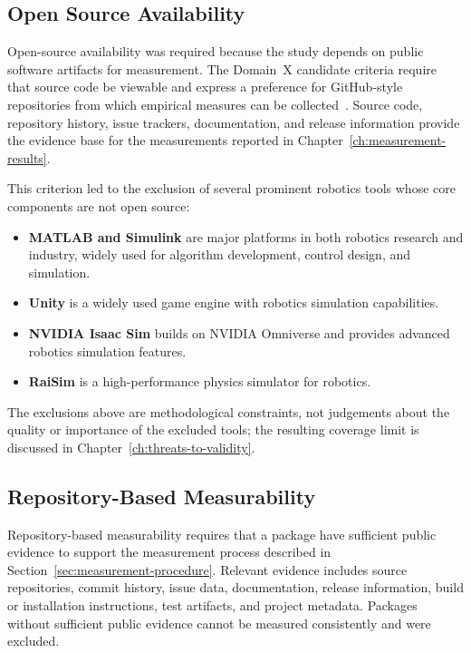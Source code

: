 \subsection{Open Source Availability}
\label{subsec:open-source-availability}

Open-source availability was required because the study depends on public software artifacts for measurement. The Domain~X candidate criteria require that source code be viewable and express a preference for GitHub-style repositories from which empirical measures can be collected~\citep{Smith2021}. Source code, repository history, issue trackers, documentation, and release information provide the evidence base for the measurements reported in Chapter~\ref{ch:measurement-results}.

This criterion led to the exclusion of several prominent robotics tools whose core components are not open source:

\begin{itemize}
    \item \textbf{MATLAB and Simulink} are major platforms in both robotics research and industry, widely used for algorithm development, control design, and simulation.
    \item \textbf{Unity} is a widely used game engine with robotics simulation capabilities.
    \item \textbf{NVIDIA Isaac Sim} builds on NVIDIA Omniverse and provides advanced robotics simulation features.
    \item \textbf{RaiSim} is a high-performance physics simulator for robotics.
\end{itemize}

The exclusions above are methodological constraints, not judgements about the quality or importance of the excluded tools; the resulting coverage limit is discussed in Chapter~\ref{ch:threats-to-validity}.

\subsection{Repository-Based Measurability}
\label{subsec:repository-based-measurability}

Repository-based measurability requires that a package have sufficient public evidence to support the measurement process described in Section~\ref{sec:measurement-procedure}. Relevant evidence includes source repositories, commit history, issue data, documentation, release information, build or installation instructions, test artifacts, and project metadata. Packages without sufficient public evidence cannot be measured consistently and were excluded.

